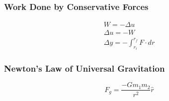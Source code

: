 \documentclass[12pt]{article}
\theoremstyle{break}
\numberwithin{theorem}{subsection}
\numberwithin{lemma}{subsection}
\numberwithin{corollary}{subsection}
\numberwithin{equation}{subsection}
\begin{document}
\subsubsection{Work Done by Conservative Forces}
\begin{align*}
	W = -\Delta u \\
	\Delta u = -W \\
	\Delta y = - \int_{r_i}^{r_f} F \cdot dr
\end{align*}

\subsubsection{Newton's Law of Universal Gravitation}
\begin{equation*}
	F_g = \frac{-G m_1 m_2}{r^2} {\hat r}
\end{equation*}
\end{document}
